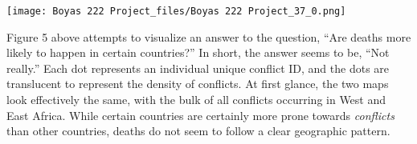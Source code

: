 \documentclass[letterpaper,10pt,english]{/usr/share/sphinx/texinputs/sphinxhowto}
\newenvironment{InvisibleVerbatim}
        {\begin{mdframed}[leftmargin=0.1\linewidth,innerleftmargin=3pt,innerrightmargin=3pt, userdefinedwidth=1\linewidth, linewidth=0pt, linecolor=white, usetwoside=false]}
        {\end{mdframed}}
\begin{document}
    

        
        

            
                \begin{InvisibleVerbatim}
                \vspace{-0.5\baselineskip}
    \begin{center}
    \texttt{[image: Boyas 222 Project\_files/Boyas 222 Project\_37\_0.png]}
    \par
    \end{center}
    
            \end{InvisibleVerbatim}
            
        
    
Figure 5 above attempts to visualize an answer to the question, ``Are
deaths more likely to happen in certain countries?'' In short, the
answer seems to be, ``Not really.'' Each dot represents an individual
unique conflict ID, and the dots are translucent to represent the
density of conflicts. At first glance, the two maps look effectively the
same, with the bulk of all conflicts occurring in West and East Africa.
While certain countries are certainly more prone towards
\emph{conflicts} than other countries, deaths do not seem to follow a
clear geographic pattern.

\end{document}
